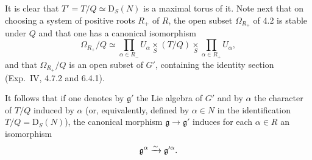 It is clear that $T'=T/Q\simeq\mathrm D_S(N)$ is a maximal torus of it. Note next that on choosing a system of positive roots $R_+$ of $R$, the open subset $\Omega_{R_+}$ of 4.2 is stable under $Q$ and that one has a canonical isomorphism
\[
\Omega_{R_+}/Q\simeq\prod_{\alpha\in R_-}U_\alpha\underset S\times(T/Q)\underset S\times\prod_{\alpha\in R_+}U_\alpha,
\]
and that $\Omega_{R_+}/Q$ is an open subset of $G'$, containing the identity section (\cf Exp.~IV, 4.7.2 and 6.4.1).

It follows that if one denotes by $\mathfrak g'$ the Lie algebra of $G'$ and by $\alpha$ the character of $T/Q$ induced by $\alpha$ (or, equivalently, defined by $\alpha\in N$ in the identification $T/Q=\mathrm D_S(N)$), the canonical morphism $\mathfrak g\to\mathfrak g'$ induces for each $\alpha\in R$ an isomorphism
\[
\mathfrak g^\alpha\xrightarrow{\sim}\mathfrak g'^\alpha.
\]
